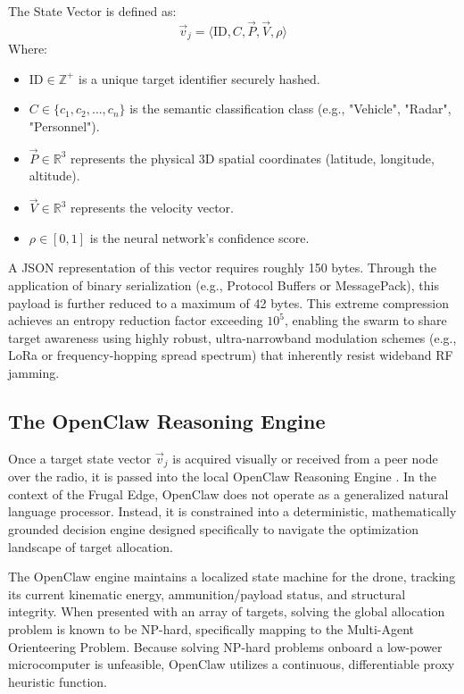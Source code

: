 The State Vector is defined as:
\begin{equation}
\vec{v}_j = \langle \text{ID}, C, \vec{P}, \vec{V}, \rho \rangle
\end{equation}
Where:
\begin{itemize}
    \item $\text{ID} \in \mathbb{Z}^+$ is a unique target identifier securely hashed.
    \item $C \in \{c_1, c_2, \dots, c_n\}$ is the semantic classification class (e.g., "Vehicle", "Radar", "Personnel").
    \item $\vec{P} \in \mathbb{R}^3$ represents the physical 3D spatial coordinates (latitude, longitude, altitude).
    \item $\vec{V} \in \mathbb{R}^3$ represents the velocity vector.
    \item $\rho \in [0,1]$ is the neural network's confidence score.
\end{itemize}

A JSON representation of this vector requires roughly 150 bytes. Through the application of binary serialization (e.g., Protocol Buffers or MessagePack), this payload is further reduced to a maximum of 42 bytes. This extreme compression achieves an entropy reduction factor exceeding $10^5$, enabling the swarm to share target awareness using highly robust, ultra-narrowband modulation schemes (e.g., LoRa or frequency-hopping spread spectrum) that inherently resist wideband RF jamming.

\subsection{The OpenClaw Reasoning Engine}
Once a target state vector $\vec{v}_j$ is acquired visually or received from a peer node over the radio, it is passed into the local OpenClaw Reasoning Engine \cite{steinberger2026}. In the context of the Frugal Edge, OpenClaw does not operate as a generalized natural language processor. Instead, it is constrained into a deterministic, mathematically grounded decision engine designed specifically to navigate the optimization landscape of target allocation.

The OpenClaw engine maintains a localized state machine for the drone, tracking its current kinematic energy, ammunition/payload status, and structural integrity. When presented with an array of targets, solving the global allocation problem is known to be NP-hard, specifically mapping to the Multi-Agent Orienteering Problem. Because solving NP-hard problems onboard a low-power microcomputer is unfeasible, OpenClaw utilizes a continuous, differentiable proxy heuristic function.

